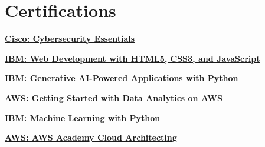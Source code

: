 \documentclass[11pt, letterpaper]{article}
\let\hrefWithoutArrow\href
\begin{document}
            \section{Certifications}
\begin{minipage}{0.32\linewidth}
    \centering
    \hrefWithoutArrow{https://www.credly.com/badges/4be49047-2053-4acf-ac0f-d43331840520/public_url}{\textbf{Cisco: Cybersecurity Essentials}}
\end{minipage}
\begin{minipage}{0.32\linewidth}
    \centering
    \hrefWithoutArrow{https://www.credly.com/badges/09b84f0e-49d0-4c54-8d78-13d04571d755/public_url}{\textbf{IBM: Web Development with HTML5, CSS3, and JavaScript}}
\end{minipage}
\begin{minipage}{0.32\linewidth}
    \centering
    \hrefWithoutArrow{https://www.credly.com/badges/6afe6c30-966f-43e5-acb0-66410b2616f4/public_url}{\textbf{IBM: Generative AI-Powered Applications with Python}}
\end{minipage}
        \vspace{0.15 cm}

\begin{minipage}{0.32\linewidth}
    \centering
    \hrefWithoutArrow{https://courses.edx.org/certificates/d20ce9d872724b1cb9fe171c04d78cb4?_gl=1*92rmh0*_gcl_au*MTMwNDUwNDE4OS4xNzIyNjA4MDMy*_ga*MzQ0MTM2NzQ4LjE3MjI2MDc5Mzg.*_ga_D3KS4KMDT0*MTcyMzgyNDEzNi4zLjAuMTcyMzgyNDE0My41My4wLjA.}{\textbf{ AWS: Getting Started with Data Analytics on AWS}}
\end{minipage}
\begin{minipage}{0.32\linewidth}
    \centering
    \hrefWithoutArrow{https://www.credly.com/badges/1b401690-1cbf-45ec-a76a-49be4f895e62/public_url}{\textbf{IBM: Machine Learning with Python}}
\end{minipage}
\begin{minipage}{0.32\linewidth}
    \centering
    \hrefWithoutArrow{https://www.credly.com/badges/e94c01e1-355c-48c0-80b6-e4761c20ec3c/public_url}{\textbf{AWS:
    AWS Academy Cloud Architecting}}
\end{minipage}
\end{document}
